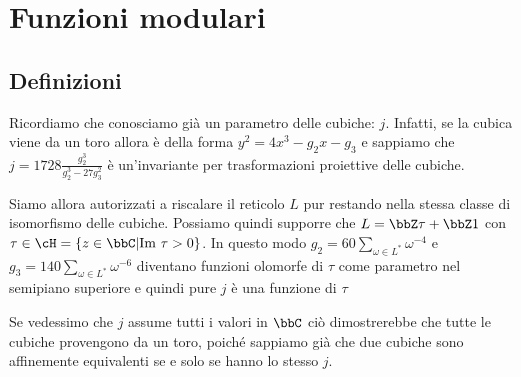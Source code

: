 \chapter{Funzioni modulari}

\section{Definizioni}


\begin{osservazione}
  Ricordiamo che conosciamo già un parametro delle cubiche:
  $j$. Infatti, se la cubica viene da un toro allora è della forma
  $y^2 = 4 x^3 - g_2 x - g_3$ e sappiamo che
  $j = 1728 \frac{g_2^3}{g_2^3 - 27 g_3^2}$ è un'invariante per
  trasformazioni proiettive delle cubiche.
\end{osservazione}

Siamo allora autorizzati a riscalare il reticolo $L$ pur restando nella
stessa classe di isomorfismo delle cubiche. Possiamo quindi supporre che
$L = \bbZ \tau + \bbZ 1$ con $\tau \in \cH = \{ z \in \bbC | \Img \tau >
0 \}$. In questo modo $g_2 = 60 \sum_{\omega \in L^*} \omega^{-4}$ e
$g_3 = 140 \sum_{\omega \in L^*} \omega^{-6}$ diventano funzioni
olomorfe di $\tau$ come parametro nel semipiano superiore e quindi pure
$j$ è una funzione di $\tau$

\begin{osservazione} \label{170123-j_suriettiva}
  Se vedessimo che $j$ assume tutti i valori in $\bbC$ ciò dimostrerebbe
  che tutte le cubiche provengono da un toro, poiché sappiamo già che
  due cubiche sono affinemente equivalenti se e solo se hanno lo stesso $j$.
\end{osservazione}

